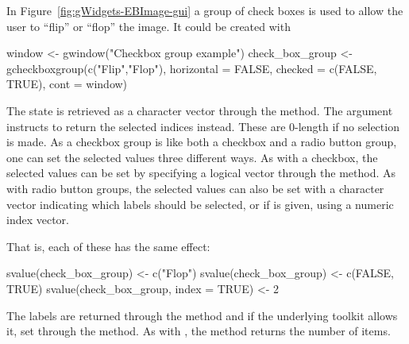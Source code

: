 In Figure~\ref{fig:gWidgets-EBImage-gui} a group of check boxes is
used to allow the user to ``flip'' or ``flop'' the image. It could be
created with

\begin{Schunk}
\begin{Sinput}
 window <- gwindow("Checkbox group example")
 check_box_group <-
   gcheckboxgroup(c("Flip","Flop"), horizontal = FALSE, 
                  checked = c(FALSE, TRUE), cont = window)
 
\end{Sinput}
\end{Schunk}
%


The state is retrieved as a character vector through the
 method. The  argument
instructs  to return the selected indices instead. These
are $0$-length if no selection is made. As a checkbox group is like
both a checkbox and a radio button group, one can set the selected
values three different ways. As with a checkbox, the selected values
can be set by specifying a logical vector through the
 method. As with radio button
groups, the selected values can also be set with a character vector
indicating which labels should be selected, or if  is
given, using a numeric index vector.


That is, each of these has the same effect:
\begin{Schunk}
\begin{Sinput}
 svalue(check_box_group) <- c("Flop")
 svalue(check_box_group) <- c(FALSE, TRUE)
 svalue(check_box_group, index = TRUE) <- 2
\end{Sinput}
\end{Schunk}

The labels are returned through the \method{[}{gcheckboxgroup} method
and if the underlying toolkit allows it, set through the
\method{[\ASSIGN}{gcheckboxgroup} method. As with ,
the  method returns the number of items.



